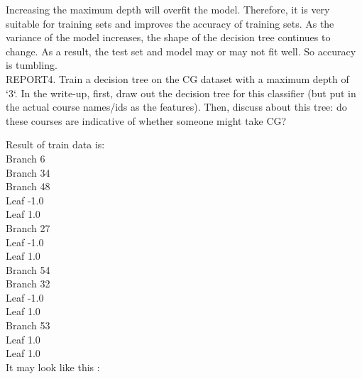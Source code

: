 \documentclass[a4 paper]{article}
\numberwithin{equation}{section}
\newcommand{\0}{\mathbf{0}}
\begin{document}
Increasing the maximum depth will overfit the model. Therefore, it is very suitable for training sets and improves the accuracy of training sets. As the variance of the model increases, the shape of the decision tree continues to change. As a result, the test set and model may or may not fit well. So accuracy is tumbling. \\

REPORT4. Train a decision tree on the CG dataset with a maximum depth of `3`. In the write-up, first, draw out the decision tree for this classifier (but put in the actual course names/ids as the features). Then, discuss about this tree: do these courses are indicative of whether someone might take CG?

Result of train data is: \\
 \newcommand\tab[1][1cm]{\hspace*{#1}}
Branch 6 \\
\tab Branch 34 \\
\tab[2cm] Branch 48 \\
\tab[3cm] Leaf -1.0 \\
\tab[3cm] Leaf 1.0 \\
\tab[2cm] Branch 27 \\
\tab[3cm] Leaf -1.0 \\
\tab[3cm] Leaf 1.0 \\
\tab Branch 54 \\
\tab[2cm] Branch 32 \\
\tab[3cm] Leaf -1.0 \\
\tab[3cm] Leaf 1.0 \\
\tab[2cm] Branch 53 \\
\tab[3cm] Leaf 1.0 \\
\tab[3cm] Leaf 1.0 \\

It may look like this : \\


\end{document}
